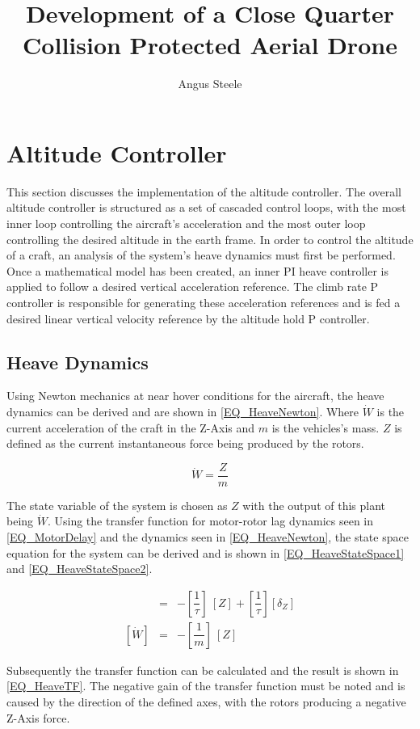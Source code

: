 \documentclass[12pt]{report}
\title{Development of a Close Quarter Collision Protected Aerial Drone}
\author{Angus Steele}
\begin{document}
	\section{Altitude Controller}
	This section discusses the implementation of the altitude controller. The overall altitude controller is structured as a set of cascaded control loops, with the most inner loop controlling the aircraft's acceleration and the most outer loop controlling the desired altitude in the earth frame. In order to control the altitude of a craft, an analysis of the system's heave dynamics must first be performed. Once a mathematical model has been created, an inner PI heave controller is applied to follow a desired vertical acceleration reference. The climb rate P controller is responsible for generating these acceleration references and is fed a desired linear vertical velocity reference by the altitude hold P controller. 
	
	\subsection{Heave Dynamics}
	Using Newton mechanics at near hover conditions for the aircraft, the heave dynamics can be derived and are shown in \eqref{EQ_HeaveNewton}. Where $\dot{W}$ is the current acceleration of the craft in the Z-Axis and $m$ is the vehicles's mass. $Z$ is defined as the current instantaneous force being produced by the rotors.
	
	\begin{equation}
	\label{EQ_HeaveNewton}
	\dot{W} = \dfrac{Z}{m}
	\end{equation}
	
	The state variable of the system is chosen as $Z$ with the output of this plant being $\dot{W}$. Using the transfer function for motor-rotor lag dynamics seen in \eqref{EQ_MotorDelay} and the dynamics seen in \eqref{EQ_HeaveNewton}, the state space equation for the system can be derived and is shown in \eqref{EQ_HeaveStateSpace1} and \eqref{EQ_HeaveStateSpace2}. 
	
	\begin{eqnarray}
	[\dot{Z}] &=& - [\dfrac{1}{\tau}] \ [Z] + [\dfrac{1}{\tau}] [\delta_Z]\label{EQ_HeaveStateSpace1}\\\label{EQ_HeaveStateSpace11}
	[\dot{W}] &=& - [\dfrac{1}{m}] \ [Z]\label{EQ_HeaveStateSpace2}
	\end{eqnarray}
	
	Subsequently the transfer function can be calculated and the result is shown in \eqref{EQ_HeaveTF}. The negative gain of the transfer function must be noted and is caused by the direction of the defined axes, with the rotors producing a negative Z-Axis force.
	
\end{document}
